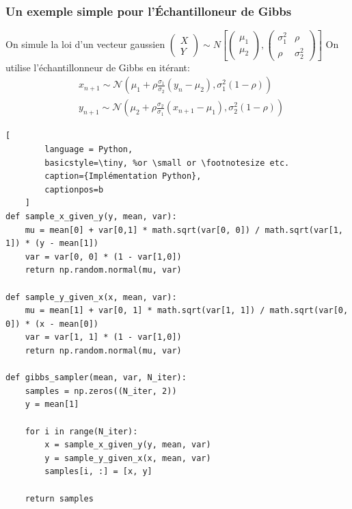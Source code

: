 \begin{frame}
    \frametitle{Un exemple simple pour l'\'Echantilloneur de Gibbs  }
    On simule la loi d'un vecteur gaussien 
    $
    \left(\begin{array}{l}
    {X} \\
    {Y}
    \end{array}\right) \sim N\left[\left(\begin{array}{l}
    {\mu_{1}} \\
    {\mu_{2}}
    \end{array}\right),\left(\begin{array}{ll}
    {\sigma_1^2} & {\rho} \\
    {\rho} & {\sigma_2^2}
    \end{array}\right)\right]
    $
On utilise l'échantillonneur de Gibbs en itérant:
$$
\begin{aligned}
&x_{n+1} \sim \mathcal{N}\left(\mu_{1}+\rho \frac{\sigma_{1}}{\sigma_{2}}\left(y_{n}-\mu_{2}\right), \sigma_{1}^{2}(1-\rho)\right)\\
&y_{n+1} \sim \mathcal{N}\left(\mu_{2}+\rho \frac{\sigma_{2}}{\sigma_{1}}\left(x_{n+1}-\mu_{1}\right), \sigma_{2}^{2}(1-\rho)\right)
\end{aligned}
$$ 
\end{frame}

\begin{frame}[fragile]
    \begin{lstlisting}[
        language = Python,
        basicstyle=\tiny, %or \small or \footnotesize etc.
        caption={Implémentation Python},
        captionpos=b
    ]
def sample_x_given_y(y, mean, var):
    mu = mean[0] + var[0,1] * math.sqrt(var[0, 0]) / math.sqrt(var[1, 1]) * (y - mean[1])
    var = var[0, 0] * (1 - var[1,0])
    return np.random.normal(mu, var)

def sample_y_given_x(x, mean, var):
    mu = mean[1] + var[0, 1] * math.sqrt(var[1, 1]) / math.sqrt(var[0, 0]) * (x - mean[0])
    var = var[1, 1] * (1 - var[1,0])
    return np.random.normal(mu, var)

def gibbs_sampler(mean, var, N_iter):
    samples = np.zeros((N_iter, 2))
    y = mean[1]

    for i in range(N_iter):
        x = sample_x_given_y(y, mean, var)
        y = sample_y_given_x(x, mean, var)
        samples[i, :] = [x, y]

    return samples
\end{lstlisting}
\end{frame}

